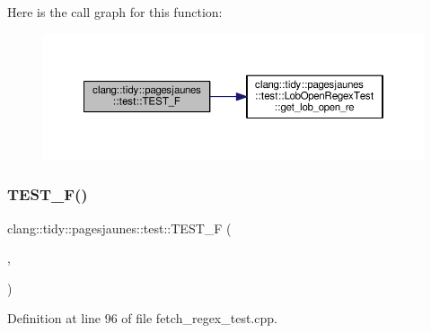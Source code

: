 Here is the call graph for this function\+:
\nopagebreak
\begin{figure}[H]
\begin{center}
\leavevmode
\includegraphics[width=350pt]{namespaceclang_1_1tidy_1_1pagesjaunes_1_1test_a48fef03720771a873ebb79ccee257d07_cgraph}
\end{center}
\end{figure}
\mbox{\label{namespaceclang_1_1tidy_1_1pagesjaunes_1_1test_aaaab9c2cf0aacb3b6638ee3b02fcb33e}} 
\subsubsection{\texorpdfstring{T\+E\+S\+T\+\_\+\+F()}{TEST\_F()}\hspace{0.1cm}{\footnotesize\ttfamily [26/57]}}
{\footnotesize\ttfamily clang\+::tidy\+::pagesjaunes\+::test\+::\+T\+E\+S\+T\+\_\+F (\begin{DoxyParamCaption}\item[{\hyperlink{classclang_1_1tidy_1_1pagesjaunes_1_1test_1_1_fetch_regex_test}{Fetch\+Regex\+Test}}]{,  }\item[{Regex\+Matching\+Weird\+Syntax}]{ }\end{DoxyParamCaption})}



Definition at line 96 of file fetch\+\_\+regex\+\_\+test.\+cpp.

